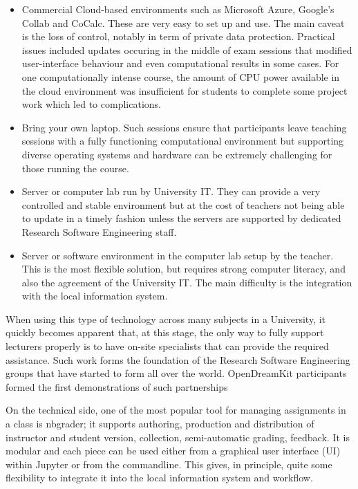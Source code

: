 \documentclass{deliverablereport}
\begin{document}
\begin{itemize}
\tightlist
\item Commercial Cloud-based environments such as Microsoft Azure,
  Google's Collab and CoCalc. These are very easy to set up and use.
  The main caveat is the loss of control, notably in term of private
  data protection. Practical issues included updates occuring in the middle of exam
  sessions that modified user-interface behaviour and even computational
  results in some cases. For one computationally intense course, the
  amount of CPU power available in the cloud environment was
  insufficient for students to complete some project work which led to
  complications.
\item
  Bring your own laptop. Such sessions ensure that participants leave
  teaching sessions with a fully functioning computational environment
  but supporting diverse operating systems and hardware can be extremely
  challenging for those running the course.
\item Server or computer lab run by University IT. They can provide a
  very controlled and stable environment but at the cost of teachers
  not being able to update in a timely fashion unless the servers are
  supported by dedicated Research Software Engineering staff.
\item Server or software environment in the computer lab setup by the
  teacher. This is the most flexible solution, but requires strong
  computer literacy, and also the agreement of the University IT. The main
  difficulty is the integration with the local information system.
\end{itemize}

When using this type of technology across many subjects in a
University, it quickly becomes apparent that, at this stage, the only
way to fully support lecturers properly is to have on-site specialists
that can provide the required assistance. Such work forms the
foundation of the Research Software Engineering groups that have
started to form all over the world. OpenDreamKit participants formed
the first demonstrations of such partnerships

On the technical side, one of the most popular tool for managing
assignments in a class is nbgrader; it supports authoring,
production and distribution of instructor and student version,
collection, semi-automatic grading, feedback. It is modular and each
piece can be used either from a graphical user interface (UI) within
Jupyter or from the commandline. This gives, in principle, quite some
flexibility to integrate it into the local information system and
workflow.
\end{document}
